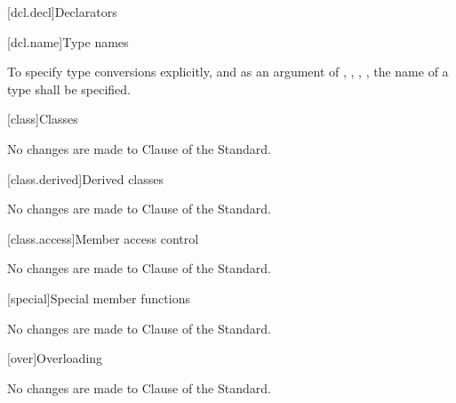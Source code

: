 
[dcl.decl]{Declarators}

[dcl.name]{Type names}

To specify type conversions explicitly, and as an argument of ,
, ,  ,  the name of a type shall be specified.

[class]{Classes}

No changes are made to Clause \the\value{chapter} of the \Cpp Standard.

[class.derived]{Derived classes}

No changes are made to Clause \the\value{chapter} of the \Cpp Standard.

[class.access]{Member access control}

No changes are made to Clause \the\value{chapter} of the \Cpp Standard.

[special]{Special member functions}

No changes are made to Clause \the\value{chapter} of the \Cpp Standard.

[over]{Overloading}

No changes are made to Clause \the\value{chapter} of the \Cpp Standard.
